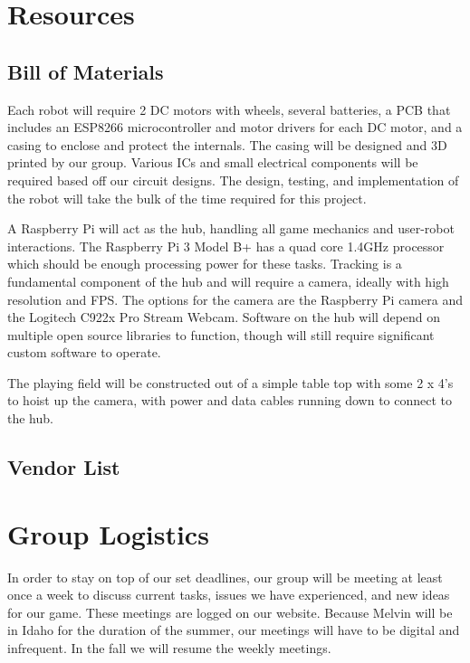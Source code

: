 \documentclass[11pt]{ieeeconf}
\begin{document}
\section{Resources}
\subsection{Bill of Materials}

Each robot will require 2 DC motors with wheels, several batteries, a PCB that includes an ESP8266 microcontroller and motor drivers for each DC motor, and a casing to enclose and protect the internals. The casing will be designed and 3D printed by our group. Various ICs and small electrical components will be required based off our circuit designs. The design, testing, and implementation of the robot will take the bulk of the time required for this project.

A Raspberry Pi will act as the hub, handling all game mechanics and user-robot interactions. The Raspberry Pi 3 Model B+ has a quad core 1.4GHz processor which should be enough processing power for these tasks. Tracking is a fundamental component of the hub and will require a camera, ideally with high resolution and FPS. The options for the camera are the Raspberry Pi camera and the Logitech C922x Pro Stream Webcam. Software on the hub will depend on multiple open source libraries to function, though will still require significant custom software to operate.

The playing field will be constructed out of a simple table top with some 2 x 4's to hoist up the camera, with power and data cables running down to connect to the hub.

\subsection{Vendor List}

\section{Group Logistics}
In order to stay on top of our set deadlines, our group will be meeting at least once a week to discuss current tasks, issues we have experienced, and new ideas for our game. These meetings are logged on our website. Because Melvin will be in Idaho for the duration of the summer, our meetings will have to be digital and infrequent. In the fall we will resume the weekly meetings.
\end{document}
